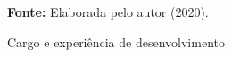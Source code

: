 \begin{figure}[ht!]
\centering

\caption{\textmd{Cargo e experiência de desenvolvimento}}
\label{fig:experienciacargo}

\par\medskip\textbf{Fonte:} Elaborada pelo autor (2020). \par\medskip

\end{figure}

